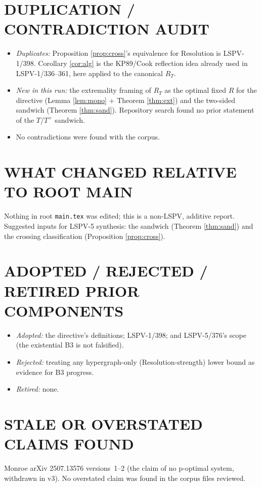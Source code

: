 \documentclass[11pt]{article}
\theoremstyle{definition}
\theoremstyle{remark}
\begin{document}
\section*{DUPLICATION / CONTRADICTION AUDIT}
\begin{itemize}
\item \emph{Duplicates:} Proposition \ref{prop:cross}'s equivalence for Resolution is
LSPV-1/398. Corollary \ref{cor:alg} is the KP89/Cook reflection idea already used in
LSPV-1/336--361, here applied to the canonical $R_T$.
\item \emph{New in this run:} the extremality framing of $R_T$ as the optimal fixed $R$ for the
directive (Lemma \ref{lem:mono} + Theorem \ref{thm:ext}) and the two-sided sandwich
(Theorem \ref{thm:sand}). Repository search found no prior statement of the $T$/$T^{+}$ sandwich.
\item No contradictions were found with the corpus.
\end{itemize}

\section*{WHAT CHANGED RELATIVE TO ROOT MAIN}
Nothing in root \texttt{main.tex} was edited; this is a non-LSPV, additive report. Suggested
inputs for LSPV-5 synthesis: the sandwich (Theorem \ref{thm:sand}) and the crossing
classification (Proposition \ref{prop:cross}).

\section*{ADOPTED / REJECTED / RETIRED PRIOR COMPONENTS}
\begin{itemize}
\item \emph{Adopted:} the directive's definitions; LSPV-1/398; and LSPV-5/376's scope
(the existential B3 is not falsified).
\item \emph{Rejected:} treating any hypergraph-only (Resolution-strength) lower bound as
evidence for B3 progress.
\item \emph{Retired:} none.
\end{itemize}

\section*{STALE OR OVERSTATED CLAIMS FOUND}
Monroe arXiv 2507.13576 versions~1--2 (the claim of no p-optimal system, withdrawn in v3). No
overstated claim was found in the corpus files reviewed.
\end{document}
